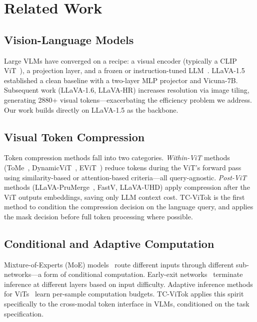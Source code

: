 \documentclass[12pt,a4paper]{article}
\begin{document}
\section{Related Work}
\label{sec:related}

\subsection{Vision-Language Models}

Large VLMs have converged on a recipe: a visual encoder (typically a CLIP
ViT~\citep{radford2021learning}), a projection layer, and a frozen or
instruction-tuned LLM~\citep{liu2024llava,li2023blip2,bai2023qwenvl}. LLaVA-1.5
\citep{liu2024llava} established a clean baseline with a two-layer MLP projector
and Vicuna-7B. Subsequent work (LLaVA-1.6, LLaVA-HR) increases resolution via
image tiling, generating 2880+ visual tokens---exacerbating the efficiency
problem we address. Our work builds directly on LLaVA-1.5 as the backbone.

\subsection{Visual Token Compression}

Token compression methods fall into two categories. \emph{Within-ViT} methods
(ToMe~\citep{bolya2022token}, DynamicViT~\citep{rao2021dynamicvit},
EViT~\citep{liang2022evit}) reduce tokens during the ViT's forward pass using
similarity-based or attention-based criteria---all query-agnostic. \emph{Post-ViT}
methods (LLaVA-PruMerge~\citep{shang2024llava}, FastV, LLaVA-UHD) apply
compression after the ViT outputs embeddings, saving only LLM context cost.
TC-ViTok is the first method to condition the compression decision on the
language query, and applies the mask decision before full token processing
where possible.

\subsection{Conditional and Adaptive Computation}

Mixture-of-Experts (MoE) models~\citep{shazeer2017moe} route different inputs
through different sub-networks---a form of conditional computation. Early-exit
networks~\citep{teerapittayanon2016branchynet} terminate inference at different
layers based on input difficulty. Adaptive inference methods for
ViTs~\citep{meng2022adavit} learn per-sample computation budgets. TC-ViTok
applies this spirit specifically to the cross-modal token interface in VLMs,
conditioned on the task specification.
\end{document}
